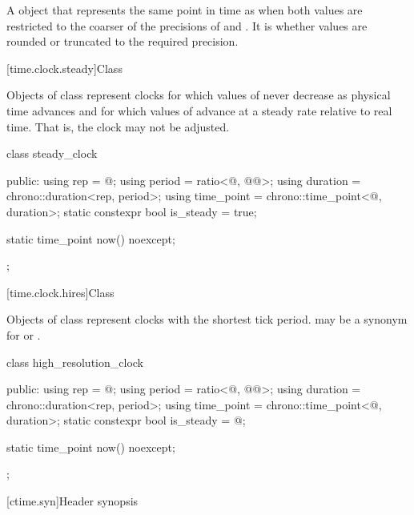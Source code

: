 \begin{itemdescr}
\pnum
\returns A  object that represents the same point in time as 
when both values are restricted to the coarser of the precisions of  and
.
It is 
whether values are rounded or truncated to the required precision.
\end{itemdescr}

[time.clock.steady]{Class }
%

\pnum
Objects of class  represent clocks for which values of 
never decrease as physical time advances and for which values of  advance at
a steady rate relative to real time. That is, the clock may not be adjusted.

\begin{codeblock}
class steady_clock {
public:
  using rep        = @\unspec@;
  using period     = ratio<@\unspecnc@, @\unspec{}@>;
  using duration   = chrono::duration<rep, period>;
  using time_point = chrono::time_point<@\unspecnc@, duration>;
  static constexpr bool is_steady = true;

  static time_point now() noexcept;
};
\end{codeblock}

[time.clock.hires]{Class }
%

\pnum
Objects of class  represent clocks with the
shortest tick period.  may be a synonym for
 or .

\begin{codeblock}
class high_resolution_clock {
public:
  using rep        = @\unspec@;
  using period     = ratio<@\unspecnc@, @\unspec{}@>;
  using duration   = chrono::duration<rep, period>;
  using time_point = chrono::time_point<@\unspecnc@, duration>;
  static constexpr bool is_steady = @\unspec@;

  static time_point now() noexcept;
};
\end{codeblock}

[ctime.syn]{Header  synopsis}

